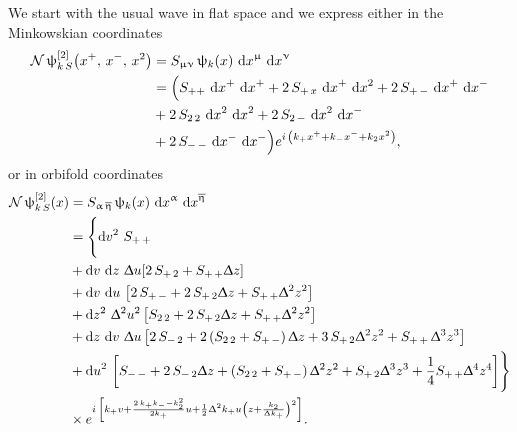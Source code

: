 We start with the usual wave in flat space and we express either in the Minkowskian coordinates
\begin{equation}
  \begin{split}
    \cN\, \psi^{[2]}_{k\, S}\qty( x^+,\, x^-,\, x^2 )
    & =
    S_{\mu\nu}\,
    \psi_k( x )\, \dd{x}^{\mu}\, \dd{x}^{\nu}
    \\
    & =
    \Bigl(%
      S_{++}\, \dd{x}^+\, \dd{x}^+
      +
      2\, S_{+\, x}\, \dd{x}^+\, \dd{x}^2
      +
      2\, S_{+\, -}\, \dd{x}^+\, \dd{x}^-
      \\
      & +
      2\, S_{2\, 2}\, \dd{x}^2\, \dd{x}^2
      +
      2\, S_{2\, -}\, \dd{x}^2\, \dd{x}^-
      \\
      & +
      2\, S_{-\, -}\, \dd{x}^-\, \dd{x}^-
    \Bigr)
    e^{i\, \qty( k_+ x^+ + k_- x^- + k_2 x^2 )},
  \end{split}
\end{equation}
or in orbifold coordinates
\begin{equation}
  \begin{split}
    \cN\,
    \psi^{[2]}_{k\, S}(x)
    & =
    S_{\alpha\, \beta}\, \psi_k(x)\, \dd{x}^{\alpha}\, \dd{x}^{\beta}
    \\
    & =
    \Biggl\lbrace
      \dss[2]{v}\,
      S_{+\, +}
      \\
      & +
      \dd{v}\, \dd{z}\, \Delta u
      \qty[%
        2\, S_{+\, 2} 
        +
        S_{+\, +} \Delta z
      ]
      \\
      & +
      \dd{v}\, \dd{u}\,
      \qty[%
        2\, S_{+\, -}
        +
        2\, S_{+\, 2} \Delta z
        +
        S_{+\, +} \Delta^2 z^2
      ]
      \\
      & +
      \dss[2]{z}\, \Delta^2 u^2\,
      \qty[%
        S_{2\, 2} 
        +
        2\, S_{+\, 2} \Delta  z
        +
        S_{+\, +} \Delta^2 z^2
      ]
      \\
      & +
      \dd{z}\, \dd{v}\, \Delta u\,
      \qty[%
        2\, S_{-\, 2} 
        +
        2\, \qty(S_{2\, 2}
        +
        S_{+\, -})\, \Delta  z
        +
        3\, S_{+\, 2} \Delta^2  z^2
        +
        S_{+\, +}\, \Delta^3  z^3
      ]
      \\
      & +
      \dd{u}^2\,
      \qty[%
        S_{-\, -}
        +
        2\, S_{-\, 2} \Delta z
        +
        \qty(S_{2\, 2} + S_{+\, -})\, \Delta^2 z^2
        +
        S_{+\, 2} \Delta^3 z^3
        +
        \frac{1}{4} S_{+\, +} \Delta^4 z^4
      ]
    \Biggr\rbrace
    \\
    & \times
    e^{%
      i\, \qty[%
        k_+ v
        +
        \frac{2\, k_+ k_- - k_2^2}{2 k_+} u
        +
        \frac{1}{2} \Delta^2 k_+ u \qty( z + \frac{k_2}{\Delta k_+})^2
      ]
    }.
  \end{split}
\end{equation}

